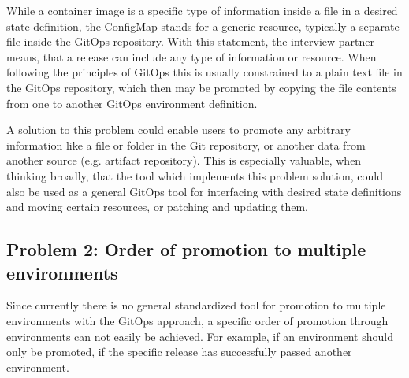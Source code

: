 %

While a container image is a specific type of information inside a file in a desired state definition,
the ConfigMap stands for a generic resource, typically a separate file inside the GitOps repository.
With this statement, the interview partner means, that a release can include any type of information
or resource. When following the principles of GitOps this is usually constrained to a plain text
file in the GitOps repository, which then may be promoted by copying the file contents from
one to another GitOps environment definition.


A solution to this problem could enable users to promote any arbitrary information
like a file or folder in the Git repository,
or another data from another source (e.g. artifact repository).
This is especially valuable, when thinking broadly, that the tool
which implements this problem solution, could also be used as a general
GitOps tool for interfacing with desired state definitions and moving certain
resources, or patching and updating them.

\subsection{Problem 2: Order of promotion to multiple environments}
\label{problem2}

Since currently there is no general standardized tool for promotion to multiple environments with the GitOps approach,
a specific order of promotion through environments can not easily be achieved.
For example, if an environment should only be promoted,
if the specific release has successfully passed another environment.

